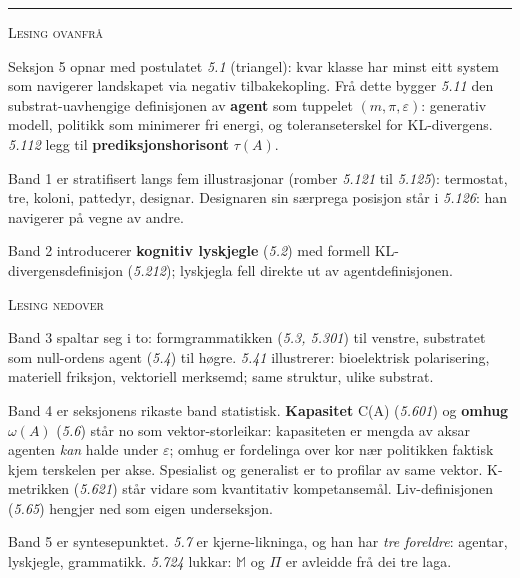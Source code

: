 \documentclass[a4paper,landscape,9pt]{article}
\begin{document}
\vspace{-0.2em}

\hrule

\vspace{0.3em}

\begin{minipage}[t]{0.325\textwidth}
{\scshape\small Lesing ovanfrå}

Seksjon 5 opnar med postulatet \emph{5.1} (triangel): kvar klasse har minst eitt system som navigerer landskapet via negativ tilbakekopling. Frå dette bygger \emph{5.11} den substrat-uavhengige definisjonen av \textbf{agent} som tuppelet $(m,\pi,\varepsilon)$: generativ modell, politikk som minimerer fri energi, og toleranseterskel for KL-divergens. \emph{5.112} legg til \textbf{prediksjonshorisont} $\tau(A)$.

Band 1 er stratifisert langs fem illustrasjonar (romber \emph{5.121} til \emph{5.125}): termostat, tre, koloni, pattedyr, designar. Designaren sin særprega posisjon står i \emph{5.126}: han navigerer på vegne av andre.

Band 2 introducerer \textbf{kognitiv lyskjegle} (\emph{5.2}) med formell KL-divergens\-definisjon (\emph{5.212}); lyskjegla fell direkte ut av agentdefinisjonen.
\end{minipage}\hfill
\begin{minipage}[t]{0.325\textwidth}
{\scshape\small Lesing nedover}

Band 3 spaltar seg i to: formgrammatikken (\emph{5.3, 5.301}) til venstre, substratet som null-ordens agent (\emph{5.4}) til høgre. \emph{5.41} illustrerer: bioelektrisk polarisering, materiell friksjon, vektoriell merksemd; same struktur, ulike substrat.

Band 4 er seksjonens rikaste band statistisk. \textbf{Kapasitet} C(A) (\emph{5.601}) og \textbf{omhug} $\omega(A)$ (\emph{5.6}) står no som vektor-storleikar: kapasiteten er mengda av aksar agenten \emph{kan} halde under $\varepsilon$; omhug er fordelinga over kor nær politikken faktisk kjem terskelen per akse. Spesialist og generalist er to profilar av same vektor. K-metrikken (\emph{5.621}) står vidare som kvantitativ kompetansemål. Liv-definisjonen (\emph{5.65}) hengjer ned som eigen underseksjon.

Band 5 er syntesepunktet. \emph{5.7} er kjerne-likninga, og han har \emph{tre foreldre}: agentar, lyskjegle, grammatikk. \emph{5.724} lukkar: $\mathbb{M}$ og $\Pi$ er avleidde frå dei tre laga.
\end{minipage}\hfill
\end{document}
